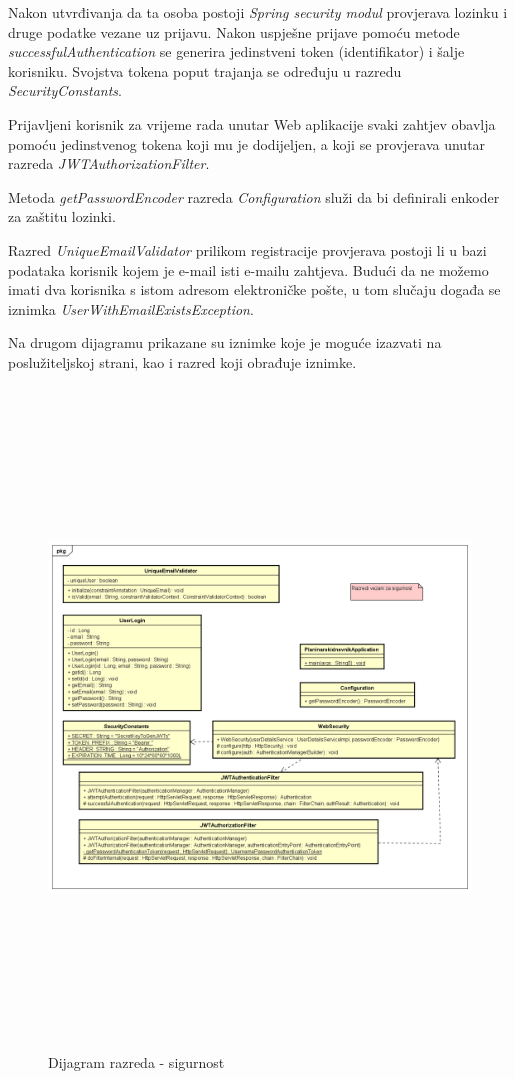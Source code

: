 			 Nakon utvrđivanja da ta osoba postoji \textit{Spring security modul} provjerava lozinku i druge podatke vezane uz prijavu. Nakon uspješne prijave pomoću metode \textit{successfulAuthentication} se generira jedinstveni token (identifikator) i šalje korisniku. Svojstva tokena poput trajanja se određuju u razredu \textit{SecurityConstants}. 
			
			Prijavljeni korisnik za vrijeme rada unutar Web aplikacije svaki zahtjev obavlja pomoću jedinstvenog tokena koji mu je dodijeljen, a koji se provjerava unutar razreda \textit{JWTAuthorizationFilter}. 
			
			Metoda \textit{getPasswordEncoder} razreda \textit{Configuration} služi da bi definirali enkoder za zaštitu lozinki. 
			
			Razred \textit{UniqueEmailValidator} prilikom registracije provjerava postoji li u bazi podataka korisnik kojem je e-mail isti e-mailu zahtjeva. Budući da ne možemo imati dva korisnika s istom adresom elektroničke pošte, u tom slučaju događa se iznimka \textit{UserWithEmailExistsException}.
			
			Na drugom dijagramu prikazane su iznimke koje je moguće izazvati na poslužiteljskoj strani, kao i razred koji obrađuje iznimke.  
		
			\begin{figure}[H]
				\includegraphics[scale=0.6, height=175mm, width=165mm]{dijagrami/helpers-class.png} %
				\centering
				\caption{Dijagram razreda - sigurnost}
				\label{fig:dijagrami_razreda5}
			\end{figure}
		

